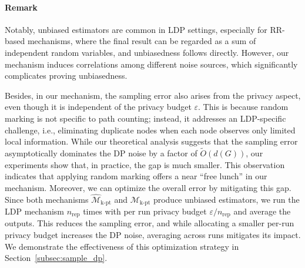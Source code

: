 \paragraph{{Remark}}
{
Notably, unbiased estimators are common in LDP settings, especially for RR-based mechanisms, where the final result can be regarded as a sum of independent random variables, and unbiasedness follows directly.
However, our mechanism induces correlations among different noise sources, which significantly complicates proving unbiasedness.}

{
Besides, in our mechanism, the sampling error also arises from the privacy aspect, even though it is independent of the privacy budget $\varepsilon$. 
This is because random marking is not specific to path counting; instead, it addresses an LDP-specific challenge, i.e., eliminating duplicate nodes when each node observes only limited local information.
While our theoretical analysis suggests that the sampling error asymptotically dominates the DP noise by a factor of $\tilde{O}(d(G))$, our experiments show that, in practice, the gap is much smaller. 
{
This observation indicates that applying random marking offers a near ``free lunch'' in our mechanism. 
}
Moreover, we can optimize the overall error by mitigating this gap.
Since both mechanisms $\widehat{\mathcal{M}}_{\mathrm{k\text{-}pt}}$ and ${\mathcal{M}}_{\mathrm{k\text{-}pt}}$ produce unbiased estimators, we run the LDP mechanism
$n_{\text{rep}}$ times with per run privacy budget $\varepsilon/n_{\text{rep}}$ and average the outputs.
This reduces the sampling error, and while allocating a smaller per-run privacy budget increases the DP noise, averaging across runs mitigates its impact. 
We demonstrate the effectiveness of this optimization strategy in
Section~\ref{subsec:sample_dp}.
}




